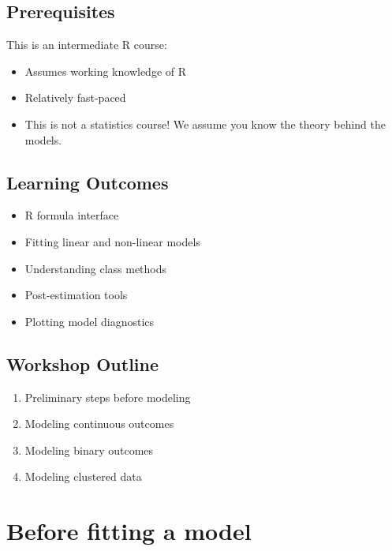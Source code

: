 \documentclass[]{book}
\providecommand{\tightlist}{%
  \setlength{\itemsep}{0pt}\setlength{\parskip}{0pt}}
\begin{document}
\hypertarget{prerequisites-1}{%
\subsection{Prerequisites}\label{prerequisites-1}}

This is an intermediate R course:

\begin{itemize}
\tightlist
\item
  Assumes working knowledge of R
\item
  Relatively fast-paced
\item
  This is not a statistics course! We assume you know the theory behind the models.
\end{itemize}

\hypertarget{learning-outcomes-1}{%
\subsection{Learning Outcomes}\label{learning-outcomes-1}}

\begin{itemize}
\tightlist
\item
  R formula interface
\item
  Fitting linear and non-linear models
\item
  Understanding class methods
\item
  Post-estimation tools
\item
  Plotting model diagnostics
\end{itemize}

\hypertarget{workshop-outline}{%
\subsection{Workshop Outline}\label{workshop-outline}}

\begin{enumerate}
\def\labelenumi{\arabic{enumi}.}
\tightlist
\item
  Preliminary steps before modeling
\item
  Modeling continuous outcomes
\item
  Modeling binary outcomes
\item
  Modeling clustered data
\end{enumerate}

\hypertarget{before-fitting-a-model}{%
\section{Before fitting a model}\label{before-fitting-a-model}}
\end{document}
